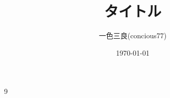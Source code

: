 \documentclass[leqno]{jsarticle}
\title{タイトル}
\author{一色三良(concious77)}
\date{\today}
\begin{document}
\maketitle






























	
\begin{thebibliography}{9}

\end{thebibliography}




			
\end{document}
